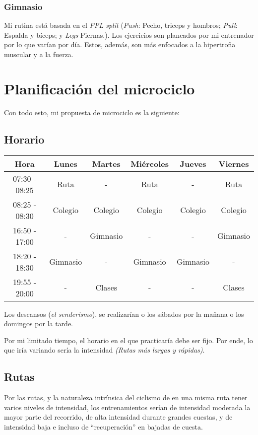 \documentclass{article}
\begin{document}
\subsubsection{Gimnasio}

Mi rutina está basada en el \textit{PPL split} (\textit{Push}: Pecho, triceps y hombros; \textit{Pull}: Espalda y bíceps; y \textit{Legs} Piernas.). Los ejercicios son planeados por
mi entrenador por lo que varían por día. Estos, además, son más enfocados a la hipertrofia muscular y a la fuerza.

\section{Planificación del microciclo}

Con todo esto, mi propuesta de microciclo es la siguiente:

\subsection{Horario}

\begin{tabular}{|| c | c c c c c ||} 
\hline
Hora & Lunes & Martes & Miércoles & Jueves & Viernes \\ 
\hline\hline
07:30 - 08:25 & Ruta & - & Ruta & - & Ruta \\
\hline
08:25 - 08:30 & Colegio & Colegio & Colegio & Colegio & Colegio \\ 
\hline
16:50 - 17:00 & - & Gimnasio & - & - & Gimnasio \\
\hline
18:20 - 18:30 & Gimnasio & - & Gimnasio & Gimnasio & - \\
\hline
19:55 - 20:00 & - & Clases & - & - & Clases \\
\hline
\end{tabular}

Los descansos (\textit{el senderismo}), se realizarían o los sábados por la mañana o los domingos por la tarde.

Por mi limitado tiempo, el horario en el que practicaría debe ser fijo. Por ende, lo que iría variando sería la intensidad \textit{(Rutas más largas y rápidas)}.

\subsection{Rutas}

Por las rutas, y la naturaleza intrínsica del ciclismo de en una misma ruta tener varios niveles de intensidad, los entrenamientos serían de intensidad moderada la mayor parte del 
recorrido, de alta intensidad durante grandes cuestas, y de intensidad baja e incluso de ``recuperación'' en bajadas de cuesta.
\end{document}
